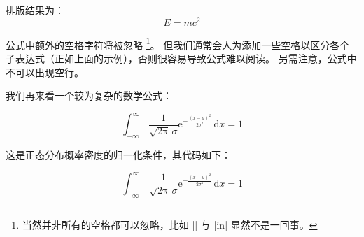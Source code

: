 排版结果为：
\[ E = mc^2 \]

公式中额外的空格字符将被忽略
\footnote{当然并非所有的空格都可以忽略，比如 |\sin| 与 |\s in| 显然不是一回事。}。
但我们通常会人为添加一些空格以区分各个子表达式（正如上面的示例），否则很容易导致公式难以阅读。
另需注意，公式中不可以出现空行。

我们再来看一个较为复杂的数学公式：

\begin{equation}
  \int^\infty_{-\infty} \, \frac{1}{\sqrt{2\mathrm{\pi}} \, \sigma}
  \mathrm{e}^{-\frac{(x-\mu)^2}{2\sigma^2}} \, \mathrm{d}x
  = 1
\end{equation}

这是正态分布概率密度的归一化条件，其代码如下：

\begin{code}
\begin{equation}
  \int^\infty_{-\infty} \, \frac{1}{\sqrt{2\mathrm{\pi}} \, \sigma}
  \mathrm{e}^{-\frac{(x-\mu)^2}{2\sigma^2}} \, \mathrm{d}x
  = 1
\end{equation}
\end{code}


